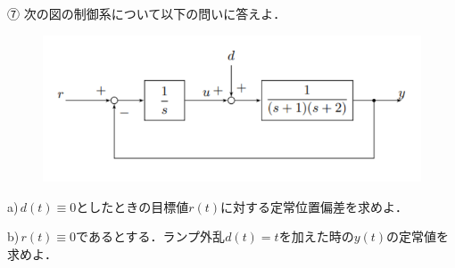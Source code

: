 ⑦ 次の図の制御系について以下の問いに答えよ．
\begin{figure}[H]
    \centering
    \includegraphics[scale=0.75]{figure1.pdf}
\end{figure}

a)\,$d(t)\equiv 0$としたときの目標値$r(t)$に対する定常位置偏差を求めよ．

b)\,$r(t)\equiv 0$であるとする．ランプ外乱$d(t)=t$を加えた時の$y(t)$の定常値を求めよ．